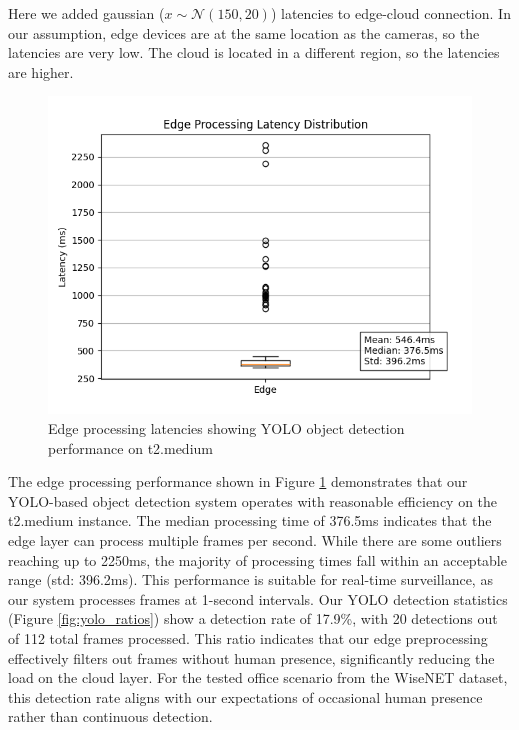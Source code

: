 \documentclass[conference]{IEEEtran}
\begin{document}
Here we added gaussian  ($x \sim \mathcal{N}(150, 20)$) latencies to edge-cloud connection. In our assumption, edge devices are at the same location as the cameras, so the latencies are very low. The cloud is located in a different region, so the latencies are higher. 
\hfill \break
\hfill \break

\begin{figure}[h!]
    \centering
    \includegraphics[width=1\linewidth]{./res/evaluation_with_latencies/edge_latencies.png}
    \caption{Edge processing latencies showing YOLO object detection performance on t2.medium }
    \label{fig:edge_latencies}
\end{figure}

The edge processing performance shown in Figure \ref{fig:edge_latencies} demonstrates that our YOLO-based object detection system operates with reasonable efficiency on the t2.medium instance. The median processing time of 376.5ms indicates that the edge layer can process multiple frames per second. While there are some outliers reaching up to 2250ms, the majority of processing times fall within an acceptable range (std: 396.2ms). This performance is suitable for real-time surveillance, as our system processes frames at 1-second intervals.
Our YOLO detection statistics (Figure \ref{fig:yolo_ratios}) show a detection rate of 17.9\%, with 20 detections out of 112 total frames processed. This ratio indicates that our edge preprocessing effectively filters out frames without human presence, significantly reducing the load on the cloud layer. For the tested office scenario from the WiseNET dataset, this detection rate aligns with our expectations of occasional human presence rather than continuous detection.
\end{document}
